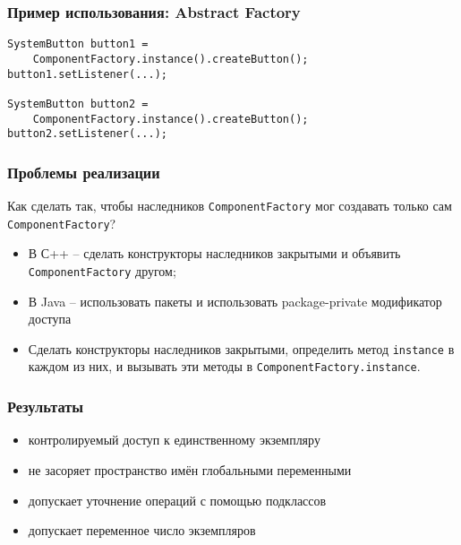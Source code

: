 \documentclass[handout]{beamer}
\begin{document}
\begin{frame}[fragile]
\frametitle{Пример использования: Abstract Factory}
\begin{lstlisting}
SystemButton button1 =
    ComponentFactory.instance().createButton();
button1.setListener(...);

SystemButton button2 =
    ComponentFactory.instance().createButton();
button2.setListener(...);
\end{lstlisting}
\end{frame}



\begin{frame}[fragile]
\frametitle{Проблемы реализации}
Как сделать так, чтобы наследников \lstinline{ComponentFactory} мог создавать
только сам \lstinline{ComponentFactory}?
\begin{itemize}
\item В С++ -- сделать конструкторы наследников закрытыми и объявить \lstinline{ComponentFactory} другом;
\item В Java -- использовать пакеты и использовать package-private модификатор доступа
\item Сделать конструкторы наследников закрытыми, определить метод \lstinline{instance} в каждом из них,
      и вызывать эти методы в \lstinline{ComponentFactory.instance}.
\end{itemize}
\end{frame}




\begin{frame}[fragile]
\frametitle{Результаты}
\begin{itemize}
\item контролируемый доступ к единственному экземпляру
\item не засоряет пространство имён глобальными переменными
\item допускает уточнение операций с помощью подклассов
\item допускает переменное число экземпляров
\end{itemize}
\end{frame}
\end{document}

